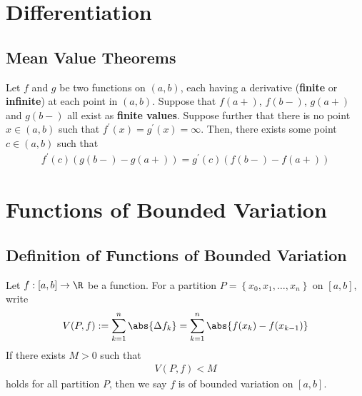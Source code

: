 \documentclass[thmcnt=section, 12pt]{elegantbook}
\begin{document}

\chapter{Differentiation}


\section{Mean Value Theorems}


\begin{theorem} \label{thm:44}
    Let $f$ and $g$ be two functions on $(a, b)$, each having a derivative (\textbf{finite} or \textbf{infinite}) at each point in $(a, b)$. Suppose that $f(a+)$, $f(b-)$, $g(a+)$ and $g(b-)$ all exist as \textbf{finite values}. Suppose further that there is no point $x \in (a, b)$ such that
    $f^\prime(x) = g^\prime(x) = \infty$. Then, there exists some point $c \in (a, b)$ such that 
    \begin{align*}
        f^\prime(c)(g(b-) - g(a+))
        = g^\prime(c)(f(b-) - f(a+))
    \end{align*} 
\end{theorem}


\chapter{Functions of Bounded Variation} %


\section{Definition of Functions of Bounded Variation}


\begin{definition}
    Let $f: [a, b] \to \R$ be a function. For a partition $P = \left\{x_0, x_1, \ldots, x_n\right\}$ on $[a, b]$, write
    \begin{align*}
        V(P, f) := \sum_{k=1}^n \abs{\Delta f_k} = \sum_{k=1}^n \abs{f(x_k) - f(x_{k-1})}
    \end{align*}
    If there exists $M > 0$ such that
    \begin{align*}
        V(P, f) < M
    \end{align*}
    holds for all partition $P$, then we say $f$ is of bounded variation on $[a, b]$.
\end{definition}
\end{document}
